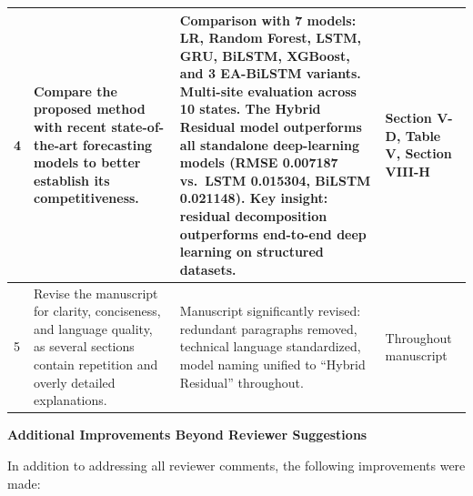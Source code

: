 \documentclass[11pt,a4paper]{article}
\begin{document}
\begin{longtable}{|p{1.5cm}|p{3.5cm}|p{6.2cm}|p{2.8cm}|}
4 & Compare the proposed method with recent state-of-the-art forecasting models to better establish its competitiveness. & Comparison with 7 models: LR, Random Forest, LSTM, GRU, BiLSTM, XGBoost, and 3 EA-BiLSTM variants. Multi-site evaluation across 10 states. The Hybrid Residual model outperforms all standalone deep-learning models (RMSE 0.007187 vs.\ LSTM 0.015304, BiLSTM 0.021148). Key insight: residual decomposition outperforms end-to-end deep learning on structured datasets. & Section V-D, Table V, Section VIII-H \\
\hline

5 & Revise the manuscript for clarity, conciseness, and language quality, as several sections contain repetition and overly detailed explanations. & Manuscript significantly revised: redundant paragraphs removed, technical language standardized, model naming unified to ``Hybrid Residual'' throughout. & Throughout manuscript \\
\hline

\end{longtable}

\vspace{1.5em}

{\large \textbf{Additional Improvements Beyond Reviewer Suggestions}}

\vspace{0.5em}
In addition to addressing all reviewer comments, the following improvements were made:

\vspace{0.5em}
\end{document}
